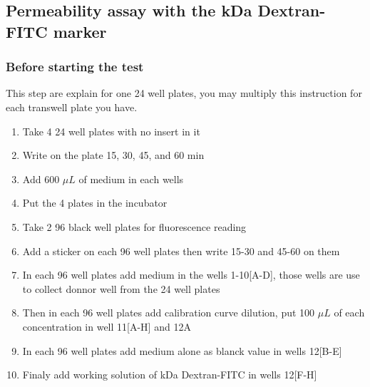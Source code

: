 \subsection{Permeability assay with the  kDa Dextran-FITC marker}

\subsubsection{Before starting the test}

This step are explain for one 24 well plates, you may multiply this instruction for each transwell plate you have.

\begin{enumerate}
\item Take 4 24 well plates with no insert in it
\item Write on the plate 15, 30, 45, and 60 min
\item Add 600 $\mu L$ of medium in each wells
\item Put the 4 plates in the incubator 
\item Take 2 96 black well plates for fluorescence reading
\item Add a sticker on each 96 well plates then write 15-30 and 45-60 on them 
\item In each 96 well plates add medium in the wells 1-10[A-D], those wells are use to collect donnor well from the 24 well plates
\item Then in each 96 well plates add calibration curve dilution, put 100 $\mu L$ of each concentration in well 11[A-H] and 12A
\item In each 96 well plates add medium alone as blanck value in wells 12[B-E]
\item Finaly add working solution of  kDa Dextran-FITC in wells 12[F-H] 
\end{enumerate}

